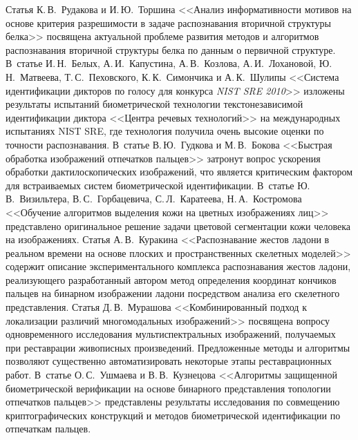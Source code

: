       Статья К.\,В.~Рудакова и И.\,Ю.~Торшина <<Анализ информативности мотивов на 
основе критерия разрешимости в задаче распознавания вторичной структуры белка>> 
посвящена актуальной проблеме развития методов и алгоритмов распознавания 
вторичной структуры белка по данным о первичной структуре. В~статье И.\,Н.~Белых, 
А.\,И.~Капустина, А.\,В.~Козлова, А.\,И.~Лохановой, Ю.\,Н.~Матвеева, 
Т.\,С.~Пеховского, К.\,К.~Симончика и А.\,К.~Шулипы <<Система идентификации 
дикторов по голосу для конкурса \textit{NIST SRE 2010}>> изложены результаты испытаний 
биометрической технологии текстонезависимой идентификации диктора <<Центра 
речевых технологий>> на международных испытаниях NIST SRE, где технология 
получила очень высокие оценки по точности распознавания. В~статье В.\,Ю.~Гудкова и 
М.\,В.~Бокова <<Быстрая обработка изображений отпечатков пальцев>> затронут вопрос 
ускорения обработки дактилоскопических изображений, что является критическим 
фактором для встраиваемых систем биометрической идентификации. В~статье 
Ю.\,В.~Визильтера, В.\,С.~Горбацевича, С.\,Л.~Каратеева, Н.\,А.~Костромова <<Обучение 
алгоритмов выделения кожи на цветных изображениях лиц>> представлено оригинальное 
решение задачи цветовой сегментации кожи человека на изображениях. Статья 
А.\,В.~Куракина <<Распознавание жестов ладони в реальном времени на основе плоских и 
пространственных скелетных моделей>> содержит описание экспериментального 
комплекса распознавания жестов ладони, реализующего разработанный автором метод 
определения координат кончиков пальцев на бинарном изображении ладони посредством 
анализа его скелетного представления. Статья Д.\,В.~Мурашова <<Комбинированный 
подход к локализации различий многомодальных изображений>> посвящена вопросу 
одновременного исследования муль\-ти\-спектральных изображений, получаемых при 
реставрации живописных произведений. Предложенные методы и алгоритмы позволяют 
существенно автоматизировать некоторые этапы реставрационных работ. В~статье 
О.\,С.~Ушмаева и В.\,В.~Кузнецова <<Алгоритмы защищенной биометрической 
верификации на основе бинарного представления топологии отпечатков пальцев>> 
представлены результаты исследования по совмещению криптографических конструкций 
и методов биометрической идентификации по отпечаткам пальцев.


\def\leftkol{\ } %

\def\rightkol{\ } %
      

 \label{end\stat}      
      